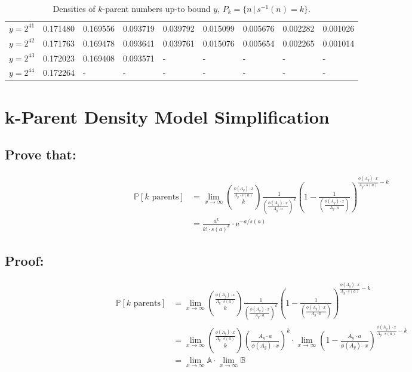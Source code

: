 \documentclass{article}
\theoremstyle{definition}
\begin{document}
\begin{table}[h!]
{\begin{tabular}{l|rrrrrrrr}
            $y = 2^{41}$             & 0.171480 & 0.169556              & 0.093719              & 0.039792              & 0.015099              & 0.005676              & 0.002282              & 0.001026              \\
            $y = 2^{42}$             & 0.171763 & 0.169478              & 0.093641              & 0.039761              & 0.015076              & 0.005654              & 0.002265              & 0.001014              \\
            $y = 2^{43}$             & 0.172023 & 0.169408              & 0.093571              & \multicolumn{1}{l}{-} & \multicolumn{1}{l}{-} & \multicolumn{1}{l}{-} & \multicolumn{1}{l}{-} & \multicolumn{1}{l}{-} \\
            $y = 2^{44}$             & 0.172264 & \multicolumn{1}{l}{-} & \multicolumn{1}{l}{-} & \multicolumn{1}{l}{-} & \multicolumn{1}{l}{-} & \multicolumn{1}{l}{-} & \multicolumn{1}{l}{-} & \multicolumn{1}{l}{-}
        \end{tabular}
    }
    \caption{Densities of $k$-parent numbers up-to bound $y$, $P_k = \{n \,|\, s^{-1}(n) = k\}$.}
\end{table}
\pagebreak
\section{k-Parent Density Model Simplification}
\subsection*{Prove that:}
\begin{align*}
    \mathbb{P}[k \text{ parents}] & =  \lim_{x \to \infty}{\frac{\phi(A_y) \cdot x}{A_y \cdot s(a)} \choose k } \frac{1}{\left(\frac{\phi(A_y) \cdot x}{ A_y \cdot a}\right)^k} \left(1- \frac{1}{\left(\frac{\phi(A_y) \cdot x}{ A_y \cdot a}\right)}\right)^{\frac{\phi(A_y) \cdot x}{A_y \cdot s(a)  } -k} \\
                                  & = \frac{a^{k}}{k! \cdot s(a)^k} \cdot \text{e}^{-a/s(a)}
\end{align*}

\subsection*{Proof:}
\begin{align*}
    \mathbb{P}[k \text{ parents}] & =  \lim_{x \to \infty}{\frac{\phi(A_y) \cdot x}{A_y \cdot s(a)} \choose k } \frac{1}{\left(\frac{\phi(A_y) \cdot x}{ A_y \cdot a}\right)^k} \left(1- \frac{1}{\left(\frac{\phi(A_y) \cdot x}{ A_y \cdot a}\right)}\right)^{\frac{\phi(A_y) \cdot x}{A_y \cdot s(a)  } -k} \\
                                  & =  \lim_{x \to \infty}{\frac{\phi(A_y) \cdot x}{A_y \cdot s(a)} \choose k } \left(\frac{A_y \cdot a}{\phi(A_y) \cdot x}\right)^k \cdot \lim_{x \to \infty}\left(1- \frac{A_y \cdot a}{\phi(A_y) \cdot x}\right)^{\frac{\phi(A_y) \cdot x}{A_y \cdot s(a)  } -k}           \\
                                  & =  \lim_{x \to \infty}\mathbb{A}  \cdot \lim_{x \to \infty} \mathbb{B}
\end{align*}
\end{document}

